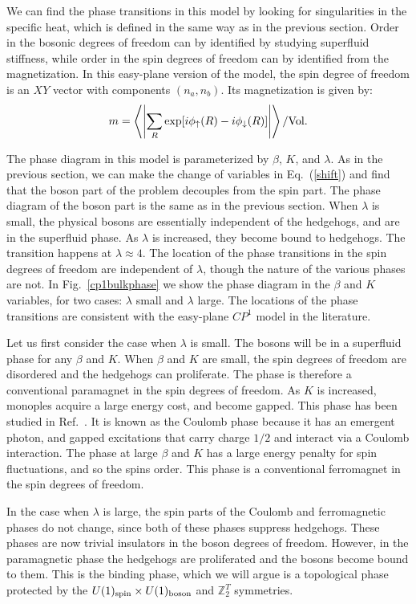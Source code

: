 \documentclass[prb,twocolumn]{revtex4-1}
\def\ztwot{\mathbb{Z}_2^T}
\begin{document}
We can find the phase transitions in this model by looking for singularities in the specific heat, which is defined in the same way as in the previous section. Order in the bosonic degrees of freedom can by identified by studying superfluid stiffness, while order in the spin degrees of freedom can by identified from the magnetization. In this easy-plane  version of the model, the spin degree of freedom is an $XY$ vector with components $(n_a,n_b)$. 
Its magnetization is given by:
\begin{equation}
m=\left\langle\left|\sum_R \exp[i\phi_\uparrow(R)-i\phi_\downarrow(R)]\right|\right\rangle /{\rm Vol}. 
\end{equation}

The phase diagram in this model is parameterized by $\beta$, $K$, and $\lambda$. As in the previous section, we can make the change of variables in Eq.~(\ref{shift}) and find that the boson part of the problem decouples from the spin part. The phase diagram of the boson part is the same as in the previous section. When $\lambda$ is small, the physical bosons are essentially independent of the hedgehogs, and are in the superfluid phase. As $\lambda$ is increased, they become bound to hedgehogs. The transition happens at $\lambda\approx 4$. 
The location of the phase transitions in the spin degrees of freedom are independent of $\lambda$, though the nature of the various phases are not. In Fig.~\ref{cp1bulkphase} we show the phase diagram in the $\beta$ and $K$ variables, for two cases: $\lambda$ small and $\lambda$ large. The locations of the phase transitions are consistent with the easy-plane $CP^1$ model in the literature.\cite{LesikSenthil} 

Let us first consider the case when $\lambda$ is small. The bosons will be in a superfluid phase for any $\beta$ and $K$. When $\beta$ and $K$ are small, the spin degrees of freedom are disordered and the hedgehogs can proliferate. The phase is therefore a conventional paramagnet in the spin degrees of freedom. 
As $K$ is increased, monoples acquire a large energy cost, and become gapped. This phase has been studied in Ref.~. It is known as the Coulomb phase because it has an emergent photon, and gapped excitations that carry charge $1/2$ and interact via a Coulomb interaction. 
The phase at large $\beta$ and $K$ has a large energy penalty for spin fluctuations, and so the spins order. This phase is a conventional ferromagnet in the spin degrees of freedom. 

In the case when $\lambda$ is large, the spin parts of the Coulomb and ferromagnetic phases do not change, since both of these phases suppress hedgehogs. These phases are now trivial insulators in the boson degrees of freedom. However, in the paramagnetic phase the hedgehogs are proliferated and the bosons become bound to them. This is the binding phase, which we will argue is a topological phase protected by the $U(1)_{\rm spin}\times U(1)_{\rm boson}$ and $\ztwot$ symmetries.
 
\end{document}
